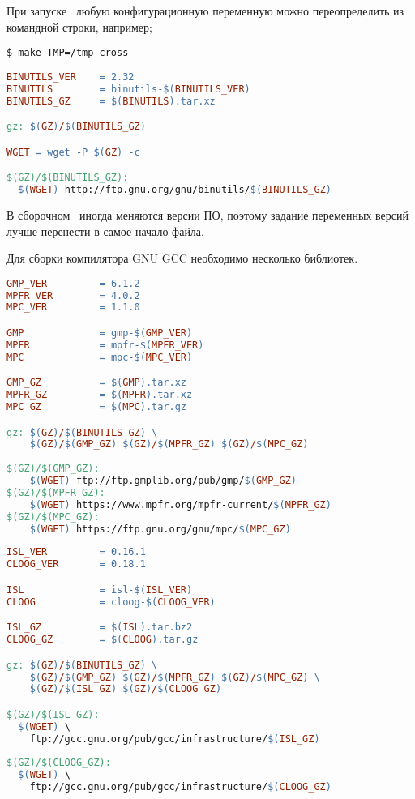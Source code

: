 При запуске \ любую конфигурационную переменную можно переопределить
из командной строки, например;
\begin{lstlisting}
$ make TMP=/tmp cross
\end{lstlisting}

\begin{lstlisting}[language=make]
BINUTILS_VER	= 2.32
BINUTILS		= binutils-$(BINUTILS_VER)
BINUTILS_GZ		= $(BINUTILS).tar.xz

gz: $(GZ)/$(BINUTILS_GZ)

WGET = wget -P $(GZ) -c

$(GZ)/$(BINUTILS_GZ):
  $(WGET) http://ftp.gnu.org/gnu/binutils/$(BINUTILS_GZ)
\end{lstlisting}

В сборочном \ иногда меняются версии ПО, поэтому задание
переменных версий лучше перенести в самое начало файла.

Для сборки компилятора GNU GCC необходимо несколько библиотек.
\begin{lstlisting}[language=make]
GMP_VER			= 6.1.2
MPFR_VER		= 4.0.2
MPC_VER			= 1.1.0

GMP				= gmp-$(GMP_VER)
MPFR			= mpfr-$(MPFR_VER)
MPC				= mpc-$(MPC_VER)

GMP_GZ			= $(GMP).tar.xz
MPFR_GZ			= $(MPFR).tar.xz
MPC_GZ			= $(MPC).tar.gz

gz: $(GZ)/$(BINUTILS_GZ) \
	$(GZ)/$(GMP_GZ) $(GZ)/$(MPFR_GZ) $(GZ)/$(MPC_GZ)
	
$(GZ)/$(GMP_GZ):
	$(WGET) ftp://ftp.gmplib.org/pub/gmp/$(GMP_GZ)
$(GZ)/$(MPFR_GZ):
	$(WGET) https://www.mpfr.org/mpfr-current/$(MPFR_GZ)
$(GZ)/$(MPC_GZ):
	$(WGET) https://ftp.gnu.org/gnu/mpc/$(MPC_GZ)
\end{lstlisting}

\begin{lstlisting}[language=make]
ISL_VER			= 0.16.1
CLOOG_VER		= 0.18.1

ISL				= isl-$(ISL_VER)
CLOOG			= cloog-$(CLOOG_VER)

ISL_GZ			= $(ISL).tar.bz2
CLOOG_GZ		= $(CLOOG).tar.gz

gz: $(GZ)/$(BINUTILS_GZ) \
	$(GZ)/$(GMP_GZ) $(GZ)/$(MPFR_GZ) $(GZ)/$(MPC_GZ) \
	$(GZ)/$(ISL_GZ) $(GZ)/$(CLOOG_GZ)

$(GZ)/$(ISL_GZ):
  $(WGET) \
    ftp://gcc.gnu.org/pub/gcc/infrastructure/$(ISL_GZ)
    
$(GZ)/$(CLOOG_GZ):
  $(WGET) \
    ftp://gcc.gnu.org/pub/gcc/infrastructure/$(CLOOG_GZ)
\end{lstlisting}

